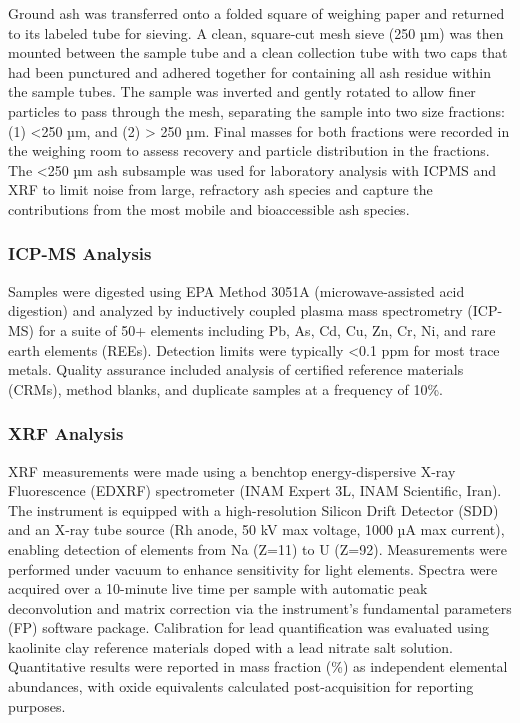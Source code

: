 \documentclass[12pt,letterpaper]{article}
\begin{document}
Ground ash was transferred onto a folded square of weighing paper and returned to its labeled tube for sieving. A clean, square-cut mesh sieve (250 µm) was then mounted between the sample tube and a clean collection tube with two caps that had been punctured and adhered together for containing all ash residue within the sample tubes. The sample was inverted and gently rotated to allow finer particles to pass through the mesh, separating the sample into two size fractions: (1) <250 µm, and (2) > 250 µm. Final masses for both fractions were recorded in the weighing room to assess recovery and particle distribution in the fractions. The <250 µm ash subsample was used for laboratory analysis with ICPMS and XRF to limit noise from large, refractory ash species and capture the contributions from the most mobile and bioaccessible ash species. 


\subsubsection{ICP-MS Analysis}

Samples were digested using EPA Method 3051A (microwave-assisted acid digestion) and analyzed by inductively coupled plasma mass spectrometry (ICP-MS) for a suite of 50+ elements including Pb, As, Cd, Cu, Zn, Cr, Ni, and rare earth elements (REEs). Detection limits were typically <0.1 ppm for most trace metals. Quality assurance included analysis of certified reference materials (CRMs), method blanks, and duplicate samples at a frequency of 10\%.

\subsubsection{XRF Analysis}

 XRF measurements were made using a benchtop energy-dispersive X-ray Fluorescence (EDXRF) spectrometer (INAM Expert 3L, INAM Scientific, Iran). The instrument is equipped with a high-resolution Silicon Drift Detector (SDD) and an X-ray tube source (Rh anode, 50 kV max voltage, 1000 µA max current), enabling detection of elements from Na (Z=11) to U (Z=92). Measurements were performed under vacuum to enhance sensitivity for light elements. Spectra were acquired over a 10-minute live time per sample with automatic peak deconvolution and matrix correction via the instrument’s fundamental parameters (FP) software package. Calibration for lead quantification was evaluated using kaolinite clay reference materials doped with a lead nitrate salt solution. Quantitative results were reported in mass fraction (\%) as independent elemental abundances, with oxide equivalents calculated post-acquisition for reporting purposes.
\end{document}
